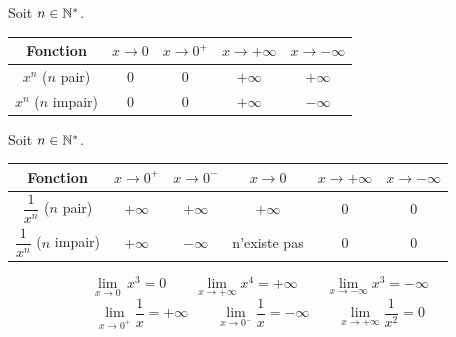 \begin{propriete}
  Soit $n \in \mathbb{N}^*$.

  \bigskip
  \begin{center}
  \renewcommand{\arraystretch}{1.7}
  \begin{tabular}{|c|c|c|c|c|}
    \hline
    \textbf{\color{navy}Fonction}
      & \textbf{\color{navy}$x \to 0$}
      & \textbf{\color{navy}$x \to 0^+$}
      & \textbf{\color{navy}$x \to +\infty$}
      & \textbf{\color{navy}$x \to -\infty$} \\
    \hline\hline
    $x^n$ \; ($n$ pair)   & $0$ & $0$ & $+\infty$ & $+\infty$ \\
    \hline
    $x^n$ \; ($n$ impair) & $0$ & $0$ & $+\infty$ & $-\infty$ \\
    \hline
  \end{tabular}
  \end{center}
\end{propriete}

\begin{propriete}
  Soit $n \in \mathbb{N}^*$.

  \bigskip
  \begin{center}
  \renewcommand{\arraystretch}{1.9}
  \begin{tabular}{|c|c|c|c|c|c|}
    \hline
    \textbf{\color{navy}Fonction}
      & \textbf{\color{navy}$x \to 0^+$}
      & \textbf{\color{navy}$x \to 0^-$}
      & \textbf{\color{navy}$x \to 0$}
      & \textbf{\color{navy}$x \to +\infty$}
      & \textbf{\color{navy}$x \to -\infty$} \\
    \hline\hline
    $\dfrac{1}{x^n}$ ($n$ pair)
      & $+\infty$ & $+\infty$ & $+\infty$ & $0$ & $0$ \\
    \hline
    $\dfrac{1}{x^n}$ ($n$ impair)
      & $+\infty$ & $-\infty$ & n'existe pas & $0$ & $0$ \\
    \hline
  \end{tabular}
  \end{center}
\end{propriete}

\begin{exemple}
  \[
    \lim_{x \to 0}\, x^3 = 0 \qquad
    \lim_{x \to +\infty} x^4 = +\infty \qquad
    \lim_{x \to -\infty} x^3 = -\infty
  \]
  \[
    \lim_{x \to 0^+} \frac{1}{x} = +\infty \qquad
    \lim_{x \to 0^-} \frac{1}{x} = -\infty \qquad
    \lim_{x \to +\infty} \frac{1}{x^2} = 0
  \]
\end{exemple}

